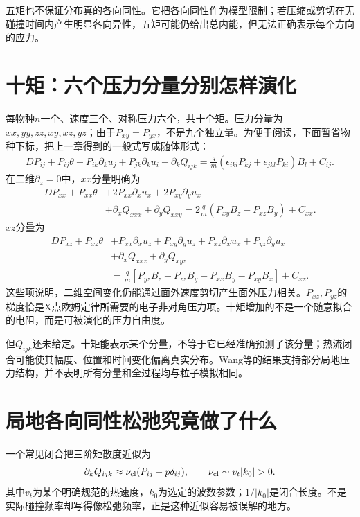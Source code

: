 五矩也不保证分布真的各向同性。它把各向同性作为模型限制；若压缩或剪切在无碰撞时间内产生明显各向异性，五矩可能仍给出总内能，但无法正确表示每个方向的应力。

\section{十矩：六个压力分量分别怎样演化}
每物种$n$一个、速度三个、对称压力六个，共十个矩。压力分量为$xx,yy,zz,xy,xz,yz$；由于$P_{xy}=P_{yx}$，不是九个独立量。为便于阅读，下面暂省物种下标，把上一章得到的一般式写成随体形式：
\begin{align}
DP_{ij}+P_{ij}\theta+P_{ik}\partial_ku_j+P_{jk}\partial_ku_i
+\partial_kQ_{ijk}
=\frac qm(\epsilon_{ikl}P_{kj}+\epsilon_{jkl}P_{ki})B_l+C_{ij}.
\label{hall:eq:ten-central}
\end{align}
在二维$\partial_z=0$中，$xx$分量明确为
\begin{align}
DP_{xx}+P_{xx}\theta
&+2P_{xx}\partial_xu_x+2P_{xy}\partial_yu_x\nonumber\\
&+\partial_xQ_{xxx}+\partial_yQ_{xxy}
=2\frac qm(P_{xy}B_z-P_{xz}B_y)+C_{xx}.
\end{align}
$xz$分量为
\begin{align}
DP_{xz}+P_{xz}\theta
&+P_{xx}\partial_xu_z+P_{xy}\partial_yu_z
+P_{xz}\partial_xu_x+P_{yz}\partial_yu_x\nonumber\\
&+\partial_xQ_{xxz}+\partial_yQ_{xyz}\nonumber\\
&=\frac qm[P_{yz}B_z-P_{zz}B_y+P_{xx}B_y-P_{xy}B_x]+C_{xz}.
\end{align}
这些项说明，二维空间变化仍能通过面外速度剪切产生面外压力相关。$P_{xz},P_{yz}$的梯度恰是X点欧姆定律所需要的电子非对角压力项。十矩增加的不是一个随意拟合的电阻，而是可被演化的压力自由度。

但$Q_{ijk}$还未给定。十矩能表示某个分量，不等于它已经准确预测了该分量；热流闭合可能使其幅度、位置和时间变化偏离真实分布。Wang等的结果支持部分局地压力结构，并不表明所有分量和全过程均与粒子模拟相同。\citep{Wang2015}

\section{局地各向同性松弛究竟做了什么}
一个常见闭合把三阶矩散度近似为
\begin{equation}
\partial_kQ_{ijk}\approx\nu_{\rm cl}(P_{ij}-p\delta_{ij}),
\qquad\nu_{\rm cl}\sim v_t|k_0|>0.
\label{hall:eq:local-relaxation}
\end{equation}
其中$v_t$为某个明确规范的热速度，$k_0$为选定的波数参数；$1/|k_0|$是闭合长度。不是实际碰撞频率却写得像松弛频率，正是这种近似容易被误解的地方。\citep{Wang2015}


